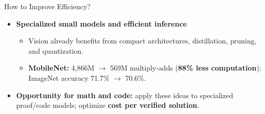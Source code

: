 \documentclass[aspectratio=169,xcolor=dvipsnames]{beamer}
\begin{document}
\begin{frame}{How to Improve Efficiency?}
    \small
    \begin{itemize}
        \item \textbf{Specialized small models and efficient inference}
        \begin{itemize}
            \item Vision already benefits from compact architectures, distillation,
                  pruning, and quantization.
            \item \textbf{MobileNet:} 4,866M $\to$ 569M multiply-adds
                  (\textbf{88\% less computation}); ImageNet accuracy 71.7\% $\to$ 70.6\%.
        \end{itemize}
        \item \textbf{Opportunity for math and code:} apply these ideas to specialized
              proof/code models; optimize \textbf{cost per verified solution}.
    \end{itemize}
\end{frame}
\end{document}
